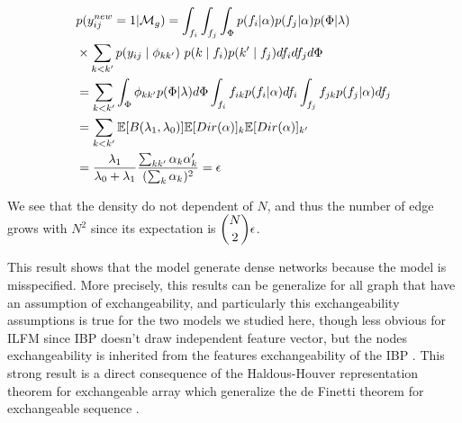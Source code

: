 
\begin{align*}
&p(y_{ij}^{new}=1| \mathcal{M}_g) = \int_{f_i} \int_{f_j} \int_{\Phi} p(f_i| \alpha ) p(f_j| \alpha)p(\Phi| \lambda) \\
&\times \sum_{k<k'} p(y_{ij} \mid \phi_{kk'})\ p(k\mid f_i)p(k'\mid f_j)df_i df_j d\Phi \\
&=  \sum_{k<k'} \int_{\Phi} \phi_{kk'} p(\Phi| \lambda) d\Phi \int_{f_i} f_{ik} p(f_i| \alpha )df_i \int_{f_j} f_{jk}  p(f_j| \alpha ) df_j \\
&= \sum_{k<k'} \mathbb{E}[B(\lambda_1, \lambda_0)] \mathbb{E}[Dir(\mathbf{\alpha} )]_k \mathbb{E}[Dir(\mathbf{\alpha})]_{k'} \\
&= \frac{\lambda_1}{\lambda_0+\lambda_1}\frac{\sum_{kk'} \alpha_k\alpha_k'}{(\sum_k \alpha_k)^2} = \epsilon
\end{align*}


We see that the density do not dependent of $N$, and thus the number of edge grows with $N^2$ since its expectation is  $\dbinom{N}{2} \epsilon$.

This result shows that the model generate dense networks because the model is misspecified. More precisely, this results can be generalize for all graph that have an assumption of exchangeability, and particularly this exchangeability assumptions is true for the two models we studied here, though less obvious for ILFM since IBP doesn't draw independent feature vector, but the nodes exchangeability is inherited from the features exchangeability of the IBP \cite{orbanz2015bayesian}. This strong result is a direct consequence of the Haldous-Houver representation theorem for exchangeable array which generalize the de Finetti theorem for exchangeable sequence \cite{orbanz2015bayesian}. 
